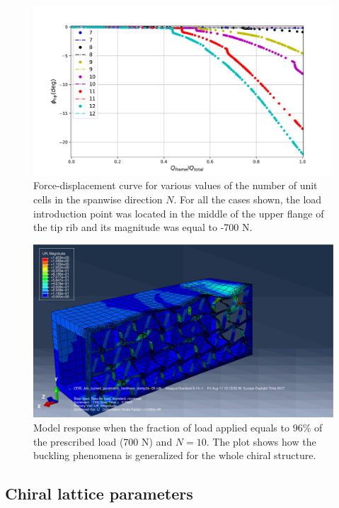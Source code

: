     \begin{figure}[!htpb] %
      \centering
      \includegraphics[width=0.8 \textwidth]{../figures/result-sim/N/force_displacement-far}
      \caption[Force-displacement curve for various values of the number of unit cells in the spanwise direction]{Force-displacement curve for various values of the number of unit cells in the spanwise direction $N$. For all the cases shown, the load introduction point was located in the middle of the upper flange of the tip rib and its magnitude was equal to -700 N.}\label{fig:forceDisplacement-far-N}
    \end{figure}

    \begin{figure}[!htpb] %
      \centering
      \includegraphics[width=0.8 \textwidth]{../figures/result-sim/N/10}
      \caption[Model response when the fraction of load applied equals to 96\% of the prescribed load (700 N) and $N = 10$]{Model response when the fraction of load applied equals to 96\% of the prescribed load (700 N) and $N = 10$. The plot shows how the buckling phenomena is generalized for the whole chiral structure.}\label{fig:N10-UR}
    \end{figure}

  \clearpage
  \subsection{Chiral lattice parameters} \label{subsec:chiral_para}

